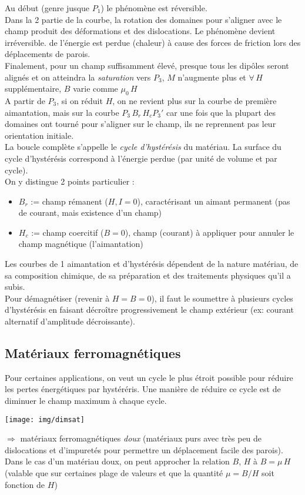 \documentclass	[11pt, a4paper, openany]{book}
\begin{document}
	Au début (genre jusque $P_1$) le phénomène est réversible.\\
	Dans la 2 partie de la courbe, la rotation des domaines pour s'aligner avec le champ produit des déformations et des dislocations. Le phénomène  devient irréversible. de l'énergie est perdue (chaleur) à cause des forces de friction lors des déplacements de parois.\\
	
	Finalement, pour un champ suffisamment élevé, presque tous les dipôles seront alignés et on atteindra la \textit{saturation} vers $P_3$, $M$ n'augmente plus et $\forall\, H$ supplémentaire, $B$ varie comme $\mu_0\,H$\\
	
	A partir de $P_3$, si on réduit $H$, on ne revient plus sur la courbe de première aimantation, mais sur la courbe $P_3\,B_r\,H_c P_3'$ car une fois que la plupart des domaines ont tourné pour s'aligner sur le champ, ils ne reprennent pas leur orientation initiale.\\
	
	La boucle complète s'appelle le \textit{cycle d'hystérésis} du matériau. La surface du cycle d'hystérésis correspond à l'énergie perdue (par unité de volume et par cycle).\\
	On y distingue 2 points particulier :\begin{itemize}
	\item $B_r$ := champ rémanent ($H,I=0$), caractérisant un aimant permanent (pas de courant, mais existence d'un champ)
	\item $H_c$ := champ coercitif ($B=0$), champ (courant) à appliquer pour annuler le champ magnétique (l'aimantation)
	\end{itemize}
	Les courbes de 1 aimantation et d'hystérésis dépendent de la nature matériau, de sa composition chimique, de sa préparation et des traitements physiques qu'il a subis.\\
	
	Pour démagnétiser (revenir à $H=B=0$), il faut le soumettre à plusieurs cycles d'hystérésis en faisant décroître progressivement le champ extérieur (ex: courant alternatif d'amplitude décroissante).
	
	\subsection{Matériaux ferromagnétiques}
	Pour certaines applications, on veut un cycle le plus étroit possible pour réduire les pertes énergétiques par hystéréris. Une manière de réduire ce cycle est de diminuer le champ maximum à chaque cycle. \begin{center}
	\texttt{[image: img/dimsat]}
	\end{center}
	$\Rightarrow$ matériaux ferromagnétiques \textit{doux} (matériaux purs avec très peu de dislocations et d'impuretés pour permettre un déplacement facile des parois).\\
	Dans le cas d'un matériau doux, on peut approcher la relation $B$, $H$ à $B=\mu\,H$ (valable que sur certaines plage de valeurs et que la quantité $\mu=B/H$ soit fonction de $H$)\\
	
\end{document}
